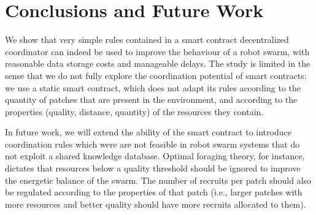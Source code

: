 \documentclass[runningheads]{llncs}
\begin{document}
\section{Conclusions and Future Work}
\label{sec:conclusion}

We show that very simple rules contained in a smart contract decentralized coordinator can indeed be used to improve the behaviour of a robot swarm, with reasonable data storage costs and manageable delays. The study is limited in the sense that we do not fully explore the coordination potential of smart contracts: we use a static smart contract, which does not adapt its rules according to the quantity of patches that are present in the environment, and according to the properties (quality, distance, quantity) of the resources they contain.

In future work, we will extend the ability of the smart contract to introduce coordination rules which were are not feasible in robot swarm systems that do not exploit a shared knowledge database. Optimal foraging theory, for instance, dictates that resources below a quality threshold should be ignored to improve the energetic balance of the swarm. The number of recruits per patch should also be regulated according to the properties of that patch (i.e., larger patches with more resources and better quality should have more recruits allocated to them).





\end{document}
